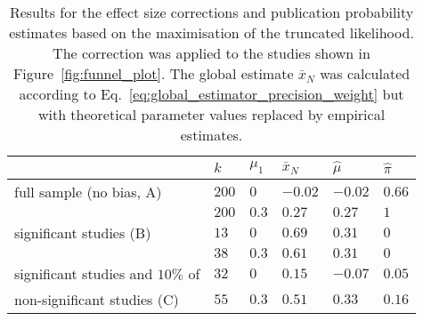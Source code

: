\begin{table}[h!]
  \begin{center}
    \begin{tabular}{ >{\raggedright\let\\\tabularnewline}p{} | >{\raggedleft\let\\\tabularnewline}p{}| >{\raggedleft\let\\\tabularnewline}p{} | >{\raggedleft\let\\\tabularnewline}p{} | >{\raggedleft\let\\\tabularnewline}p{} | >{\raggedleft\let\\\tabularnewline}p{}} 
    \hline
     & $k$\TBstrut & $\mu_1$ & $\bar{x}_N$ & $\hat{\mu}$ & $\hat{\pi}$\\ 
    \hline
    full sample (no bias, A)\Tstrut & $200$ & $0$ & $-0.02$ & $-0.02$ & $0.66$ \\ 
    \Bstrut & $200$\Bstrut & $0.3$ & $0.27$ & $0.27$ & $1$\\
    \hline
    significant studies (B)\Tstrut & $13$ & $0$ & $0.69$ & $0.31$ & $0$ \\
    \Bstrut & $38$\Bstrut & $0.3$ & $0.61$ & $0.31$ & $0$ \\
    \hline
    significant studies and $10\%$ of\Tstrut & $32$ & $0$ & $0.15$ & $-0.07$ & $0.05$ \\
    non-significant studies (C)\Bstrut & $55$\Bstrut & $0.3$ & $0.51$ & $0.33$ & $0.16$\\
 \hline
\end{tabular}
    \caption[Maximising the truncated likelihood to correct for publication bias.]{Results for the effect size corrections and publication probability estimates based on the maximisation of the truncated likelihood. The correction was applied to the studies shown in Figure~\ref{fig:funnel_plot}. The global estimate $\bar{x}_N$ was calculated according to Eq.~\ref{eq:global_estimator_precision_weight} but with theoretical parameter values replaced by empirical estimates.}
    \label{tab:maximise_trunc_likelihood}
  \end{center}
\end{table}
